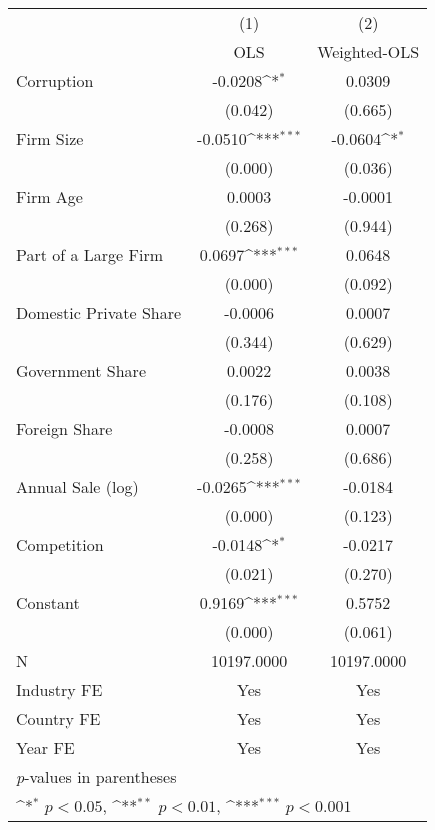 {
\def\sym#1{\ifmmode^{#1}\else\(^{#1}\)\fi}
\begin{tabular}{l*{2}{c}}
\hline\hline
                    &\multicolumn{1}{c}{(1)}         &\multicolumn{1}{c}{(2)}         \\
                    &         OLS         &Weighted-OLS         \\
\hline
Corruption          &     -0.0208\sym{*}  &      0.0309         \\
                    &     (0.042)         &     (0.665)         \\
Firm Size           &     -0.0510\sym{***}&     -0.0604\sym{*}  \\
                    &     (0.000)         &     (0.036)         \\
Firm Age            &      0.0003         &     -0.0001         \\
                    &     (0.268)         &     (0.944)         \\
Part of a Large Firm&      0.0697\sym{***}&      0.0648         \\
                    &     (0.000)         &     (0.092)         \\
Domestic Private Share&     -0.0006         &      0.0007         \\
                    &     (0.344)         &     (0.629)         \\
Government Share    &      0.0022         &      0.0038         \\
                    &     (0.176)         &     (0.108)         \\
Foreign Share       &     -0.0008         &      0.0007         \\
                    &     (0.258)         &     (0.686)         \\
Annual Sale (log)   &     -0.0265\sym{***}&     -0.0184         \\
                    &     (0.000)         &     (0.123)         \\
Competition         &     -0.0148\sym{*}  &     -0.0217         \\
                    &     (0.021)         &     (0.270)         \\
Constant            &      0.9169\sym{***}&      0.5752         \\
                    &     (0.000)         &     (0.061)         \\
\hline
N                   &  10197.0000         &  10197.0000         \\
Industry FE         &         Yes         &         Yes         \\
Country FE          &         Yes         &         Yes         \\
Year FE             &         Yes         &         Yes         \\
\hline\hline
\multicolumn{3}{l}{\footnotesize \textit{p}-values in parentheses}\\
\multicolumn{3}{l}{\footnotesize \sym{*} \(p<0.05\), \sym{**} \(p<0.01\), \sym{***} \(p<0.001\)}\\
\end{tabular}
}
